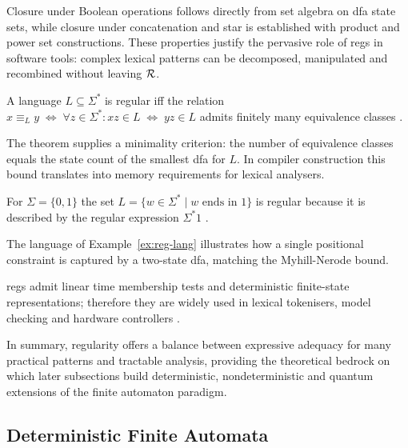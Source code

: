 Closure under Boolean operations follows directly from set algebra on \gls{dfa} state sets,  
while closure under concatenation and star is established with product and power set constructions.  
These properties justify the pervasive role of \glspl{reg} in software tools:  
complex lexical patterns can be decomposed, manipulated and recombined without leaving ${\cal R}$.  

\begin{theorem}\label{thm:myhill-nerode}
A language $L\subseteq\Sigma^{\ast}$ is regular  
iff the relation
$x\equiv_{L}y \;\Longleftrightarrow\; \forall z\in\Sigma^{\ast}\colon  
xz\in L \;\Leftrightarrow\; yz\in L$
admits finitely many equivalence classes \cite{hopcroft2001introduction}.  
\end{theorem}

The theorem supplies a minimality criterion:  
the number of equivalence classes equals the state count of the smallest \gls{dfa} for $L$.  
In compiler construction this bound translates into memory requirements for lexical analysers.  

\begin{example}\label{ex:reg-lang}
For $\Sigma=\{0,1\}$ the set
$L=\{w\in\Sigma^{\ast}\mid w\text{ ends in }1\}$ is regular because it
is described by the regular expression $\Sigma^{\ast}1$ \cite{hopcroft2001introduction}.  
\end{example}

The language of Example~\ref{ex:reg-lang} illustrates how a single positional constraint  
is captured by a two-state \gls{dfa}, matching the Myhill-Nerode bound.  

\begin{observation}\label{obs:why-regular-matters}
\glspl{reg} admit linear time membership tests and deterministic
finite-state representations; therefore they are widely used in lexical
tokenisers, model checking and hardware controllers \cite{aho1974design}.  
\end{observation}

In summary, regularity offers a balance between expressive adequacy for many practical patterns  
and tractable analysis, providing the theoretical bedrock on which later subsections build deterministic,  
nondeterministic and quantum extensions of the finite automaton paradigm.
\subsection{Deterministic Finite Automata}\label{subsec:dfa}

